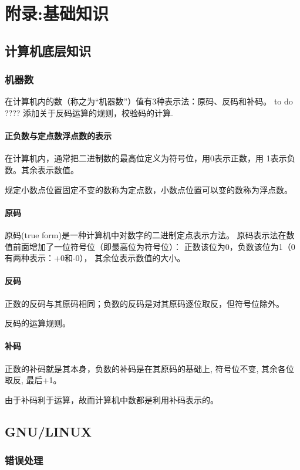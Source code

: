 \chapter{附录:基础知识}

\minitoc
	\section{计算机底层知识}
		\subsection{机器数}
			在计算机内的数（称之为“机器数”）值有3种表示法：原码、反码和补码。
			to do ???? 添加关于反码运算的规则，校验码的计算.
			\subsubsection{正负数与定点数浮点数的表示}
				在计算机内，通常把二进制数的最高位定义为符号位，用0表示正数，用
				1表示负数。其余表示数值。

				规定小数点位置固定不变的数称为定点数，小数点位置可以变的数称为浮点数。
				
			\subsubsection{原码}
				原码(true form)是一种计算机中对数字的二进制定点表示方法。
				原码表示法在数值前面增加了一位符号位（即最高位为符号位）：
				正数该位为0，负数该位为1（0有两种表示：+0和-0），
				其余位表示数值的大小。
			\subsubsection{反码}
				正数的反码与其原码相同；负数的反码是对其原码逐位取反，但符号位除外。
				
				反码的运算规则。

			\subsubsection{补码}
				正数的补码就是其本身，负数的补码是在其原码的基础上, 符号位不变, 其余各位取反, 最后+1。
				
				由于补码利于运算，故而计算机中数都是利用补码表示的。
	\section{GNU/LINUX}
		\subsection{错误处理}
